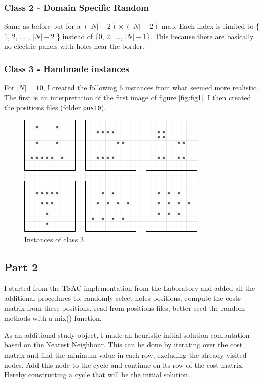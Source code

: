 \documentclass[a4paper,12pt]{article}
\begin{document}
			
			\subsubsection{Class 2 - Domain Specific Random}
				Same as before but for a $ (|N|-2) \times (|N|-2)  $ map.
				Each index is limited to \{$ 1 $, $ 2 $, $\ldots$ , $ |N|-2 $ \} instead of \{$ 0 $, $ 2 $, $\ldots$, $ |N|-1 $\}.
				This because there are basically no electric panels with holes near the border.
				
			\subsubsection{Class 3 - Handmade instances}
				For $ |N| = 10 $, I created the following 6 instances from what seemed more realistic.
				The first is an interpretation of the first image of figure \ref{fig:fig1}.
				I then created the positions files (folder \texttt{pos10}).
				
				\begin{figure}[H]
					\centering
					\includegraphics[width=.7\linewidth]{class3.png}  
					\caption{Instances of class 3}
					\label{fig:figsClass3}
				\end{figure}
			
					
			
		\subsection{Part 2}

			I started from the TSAC implementation from the Laboratory and added all the additional procedures to: randomly select holes positions, compute the costs matrix from these positions, read from positions files, better seed the random methods with a mix() function.
			
			As an additional study object, I made an heuristic initial solution computation based on the Nearest Neighbour.
			This can be done by iterating over the cost matrix and find the minimum value in each row, excluding the already visited nodes.
			Add this node to the cycle and continue on its row of the cost matrix.
			Hereby constructing a cycle that will be the initial solution.
			
\end{document}
